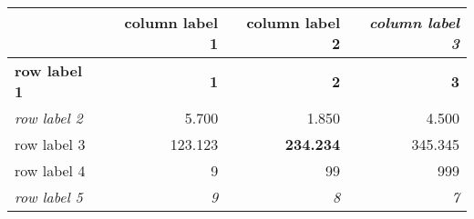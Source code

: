 \begin{tabular}{lrrr} 
\toprule 
  	 & 	 \textbf{column label 1} 	 & 	 column label 2 	 & 	 \textit{column label 3} \\ 
\midrule 
\textbf{row label 1} 	 & 	 \textbf{1} 	 & 	 \textbf{2} 	 & 	 \textbf{3} \\ 
\textit{row label 2} 	 & 	 5.700 	 & 	 1.850 	 & 	 4.500 \\ 
row label 3 	 & 	 123.123 	 & 	 \textbf{234.234} 	 & 	 345.345 \\ 
row label 4 	 & 	 9 	 & 	 99 	 & 	 999 \\ 
\textit{row label 5} 	 & 	 \textit{9} 	 & 	 \textit{8} 	 & 	 \textit{7} \\ 
\bottomrule 
\end{tabular}